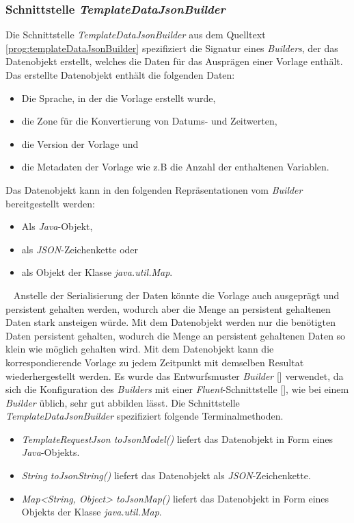 \subsubsection{Schnittstelle \emph{TemplateDataJsonBuilder}}
\label{sec:templateDataJsonBuilder}
Die Schnittstelle \emph{TemplateDataJsonBuilder} aus dem Quelltext  \ref{prog:templateDataJsonBuilder} spezifiziert die Signatur eines \emph{Builders}, der das Datenobjekt erstellt, welches die Daten für das Ausprägen einer Vorlage enthält. Das erstellte Datenobjekt enthält die folgenden Daten:
\begin{itemize}
	\item Die Sprache, in der die Vorlage erstellt wurde,
	\item die Zone für die Konvertierung von Datums- und Zeitwerten,
	\item die Version der Vorlage und 
	\item die Metadaten der Vorlage wie z.B die Anzahl der enthaltenen Variablen.
\end{itemize} 
Das Datenobjekt kann in den folgenden Repräsentationen vom \emph{Builder} bereitgestellt werden:
\begin{itemize}
	\item Als \emph{Java}-Objekt,
	\item als \emph{JSON}-Zeichenkette oder
	\item als Objekt der Klasse \emph{java.util.Map}.
\end{itemize}
\ \newline
Anstelle der Serialisierung der Daten könnte die Vorlage auch ausgeprägt und persistent gehalten werden, wodurch aber die Menge an persistent gehaltenen Daten stark ansteigen würde. Mit dem Datenobjekt werden nur die benötigten Daten persistent gehalten, wodurch die Menge an persistent gehaltenen Daten so klein wie möglich gehalten wird. Mit dem Datenobjekt kann die korrespondierende Vorlage zu jedem Zeitpunkt mit demselben Resultat wiederhergestellt werden.
\newline
\newline
Es wurde das Entwurfsmuster \emph{Builder} [\cite[97]{designPatterns}] verwendet, da sich die Konfiguration des \emph{Builders} mit einer \emph{Fluent}-Schnittstelle [\cite{fowlerFluentInterface}], wie bei einem \emph{Builder} üblich, sehr gut abbilden lässt. Die Schnittstelle \emph{TemplateDataJsonBuilder} spezifiziert folgende Terminalmethoden.
\begin{itemize}
	\item\emph{TemplateRequestJson toJsonModel()} liefert das Datenobjekt in Form eines \emph{Java}-Objekts.
	\item\emph{String toJsonString()} liefert das Datenobjekt als \emph{JSON}-Zeichenkette.
	\item\emph{Map<String, Object> toJsonMap()} liefert das Datenobjekt in Form eines Objekts der Klasse \emph{java.util.Map}.
\end{itemize} 
\ \newpage

